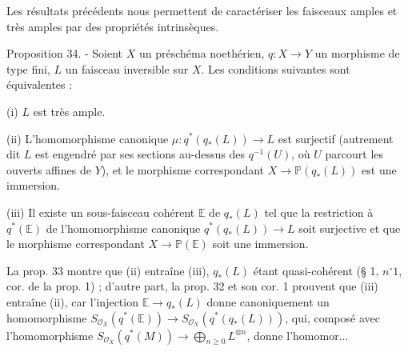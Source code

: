 Les résultats précédents nous permettent de caractériser les faisceaux amples et très amples par des propriétés intrinsèques.

Proposition 34. - Soient $X$ un préschéma noethérien, $q : X \to Y$ un morphisme de type fini, $L$ un faisceau inversible sur $X$. Les conditions suivantes sont équivalentes :

(i) $L$ est très ample.

(ii) L'homomorphisme canonique $\mu : q^*(q_*(L)) \to L$ est surjectif (autrement dit $L$ est engendré par ses sections au-dessus des $q^{-1}(U)$, où $U$ parcourt les ouverts affines de $Y$), et le morphisme correspondant $X \to \mathbb{P}(q_*(L))$ est une immersion.

(iii) Il existe un sous-faisceau cohérent $\mathbb{E}$ de $q_*(L)$ tel que la restriction à $q^*(\mathbb{E})$ de l'homomorphisme canonique $q^*(q_*(L)) \to L$ soit surjective et que le morphisme correspondant $X \to \mathbb{P}(\mathbb{E})$ soit une immersion.

La prop. 33 montre que (ii) entraîne (iii), $q_*(L)$ étant quasi-cohérent (§ 1, $n^\circ 1$, cor. de la prop. 1) ; d'autre part, la prop. 32 et son cor. 1 prouvent que (iii) entraîne (ii), car l'injection $\mathbb{E} \to q_*(L)$ donne canoniquement un homomorphisme $S_{\mathcal{O}_X}(q^*(\mathbb{E})) \to S_{\mathcal{O}_X}(q^*(q_*(L)))$, qui, composé avec l'homomorphisme $S_{\mathcal{O}_X}(q^*(M)) \to \bigoplus_{n \geq 0} L^{\otimes n}$, donne l'homomor...


\newpage


